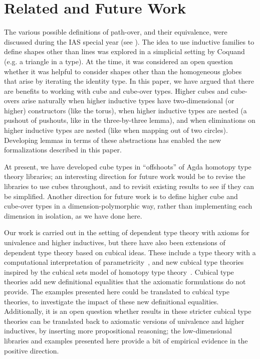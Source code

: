 \section{Related and Future Work}

The various possible definitions of path-over, and their equivalence,
were discussed during the IAS special year (see \citep[Remark
  6.3.2]{uf13hott-book}).  The idea to use inductive families to define
shapes other than lines was explored in a simplicial setting by Coquand
(e.g. a triangle in a type).  At the time, it was considered an open
question whether it was helpful to consider shapes other than the
homogeneous globes that arise by iterating the identity type.  In this
paper, we have argued that there are benefits to working with cube and
cube-over types.  Higher cubes and cube-overs arise naturally when
higher inductive types have two-dimensional (or higher) constructors
(like the torus), when higher inductive types are nested (a pushout of
pushouts, like in the three-by-three lemma), and when eliminations on
higher inductive types are nested (like when mapping out of two
circles).  Developing lemmas in terms of these abstractions has enabled
the new formalizations described in this paper.

At present, we have developed cube types in ``offshoots'' of Agda
homotopy type theory libraries; an interesting direction for future work
would be to revise the libraries to use cubes throughout, and to revisit
existing results to see if they can be simplified.  Another direction
for future work is to define higher cube and cube-over types in a
dimension-polymorphic way, rather than implementing each dimension in
isolation, as we have done here.

Our work is carried out in the setting of dependent type theory with
axioms for univalence and higher inductives, but there have also been
extensions of dependent type theory based on cubical ideas.  These
include a type theory with a computational interpretation of
parametricity~\citep{bernardy12parametricity}, and new cubical type
theories~\citep{coquand14variations,altenkirchkaposi14cubical,lb14cubes-oxford}
inspired by the cubical sets model of homotopy type
theory~\citep{coquand+13cubical}.  Cubical type theories add new
definitional equalities that the axiomatic formulations do not provide.
The examples presented here could be translated to cubical type
theories, to investigate the impact of these new definitional
equalities.  Additionally, it is an open question whether results in
these stricter cubical type theories can be translated back to axiomatic
versions of univalence and higher inductives, by inserting more
propositional reasoning; the low-dimensional libraries and examples
presented here provide a bit of empirical evidence in the positive
direction.
